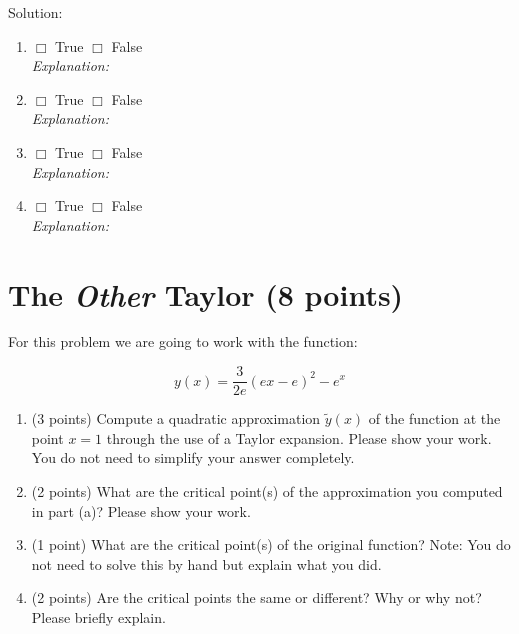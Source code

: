 \documentclass[]{article}
\begin{document}
Solution:
\begin{enumerate}[label=(\alph*)]
    \item $\Box$ True \quad \quad $\Box$ False \\
    \textit{Explanation: }
          
    \item $\Box$ True \quad \quad $\Box$ False \\
    \textit{Explanation: }
          
    \item $\Box$ True \quad \quad $\Box$ False \\
    \textit{Explanation: }
          
    \item $\Box$ True \quad \quad $\Box$ False \\
    \textit{Explanation: }
\end{enumerate}

\newpage

\section{The \textit{Other} Taylor (8 points)}
For this problem we are going to work with the function:
\begin{tcolorbox}[left=14pt, arc=0pt, outer arc=0pt, colframe=blue!5, colback=blue!5]
$$y(x) = \frac{3}{2e}(ex-e)^2 - e^x$$
\end{tcolorbox}
\begin{enumerate}[label=(\alph*)]
    \item (3 points) Compute a quadratic approximation $\tilde{y}(x)$ of the function at the point $x=1$ through the use of a Taylor expansion. Please show your work. You do not need to simplify your answer completely.
    \item (2 points) What are the critical point(s) of the approximation you computed in part (a)? Please show your work.
    \item (1 point) What are the critical point(s) of the original function?  Note: You do not need to solve this by hand but explain what you did.
    \item (2 points) Are the critical points the same or different? Why or why not? Please briefly explain.
\end{enumerate}
\end{document}
